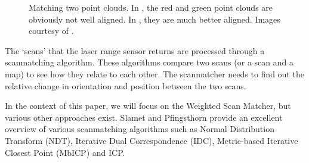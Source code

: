 \begin{figure}[ht]
\centering
{}
\caption{Matching two point clouds. In , the red and green point clouds are obviously not well aligned. In , they are much better aligned. Images courtesy of \cite{slamet2006manifoldslam}.}
\label{fig:slamet41}
\end{figure} 

The `scans' that the laser range sensor returns are processed through a scanmatching algorithm. These algorithms compare two scans (or a scan and a map) to see how they relate to each other. The scanmatcher needs to find out the relative change in orientation and position between the two scans.

In the context of this paper, we will focus on the Weighted Scan Matcher, but various other approaches exist. Slamet and Pfingsthorn \cite{ethembabaoglu2007active} provide an excellent overview of various scanmatching algorithms such as Normal Distribution Transform (NDT), Iterative Dual Correspondence (IDC), Metric-based Iterative Closest Point (MbICP) and ICP.


